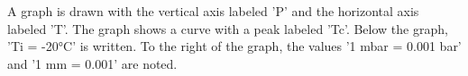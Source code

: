 A graph is drawn with the vertical axis labeled 'P' and the horizontal axis labeled 'T'. The graph shows a curve with a peak labeled 'Tc'. Below the graph, 'Ti = -20°C' is written. To the right of the graph, the values '1 mbar = 0.001 bar' and '1 mm = 0.001' are noted.